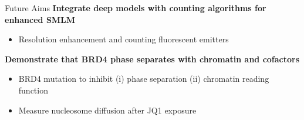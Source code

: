 \documentclass{beamer}					%
\begin{document}

\begin{frame}{Future Aims}
\textbf{Integrate deep models with counting algorithms for enhanced SMLM}
\begin{itemize}
\item Resolution enhancement and counting fluorescent emitters
\end{itemize}
\textbf{Demonstrate that BRD4 phase separates with chromatin and cofactors}
\begin{itemize}
\item BRD4 mutation to inhibit (i) phase separation (ii) chromatin reading function
\item Measure nucleosome diffusion after JQ1 exposure
\end{itemize}
\end{frame}
\end{document}
